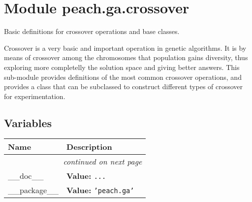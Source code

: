 %
%
%


\section{Module peach.ga.crossover}

    \label{peach:ga:crossover}

Basic definitions for crossover operations and base classes.

Crossover is a very basic and important operation in genetic algorithms. It is
by means of crossover among the chromosomes that population gains diversity,
thus exploring more completelly the solution space and giving better answers.
This sub-module provides definitions of the most common crossover operations,
and provides a class that can be subclassed to construct different types of
crossover for experimentation.


  \subsection{Variables}

    \vspace{-1cm}
\hspace{\varindent}\begin{longtable}{|p{\varnamewidth}|p{\vardescrwidth}|l}
\cline{1-2}
\cline{1-2} \centering \textbf{Name} & \centering \textbf{Description}& \\
\cline{1-2}
\endhead\cline{1-2}\multicolumn{3}{r}{\small\textit{continued on next page}}\\\endfoot\cline{1-2}
\endlastfoot\raggedright \_\-\_\-d\-o\-c\-\_\-\_\- & \raggedright \textbf{Value:} 
{\tt \texttt{...}}&\\
\cline{1-2}
\raggedright \_\-\_\-p\-a\-c\-k\-a\-g\-e\-\_\-\_\- & \raggedright \textbf{Value:} 
{\tt \texttt{'}\texttt{peach.ga}\texttt{'}}&\\
\cline{1-2}
\end{longtable}


